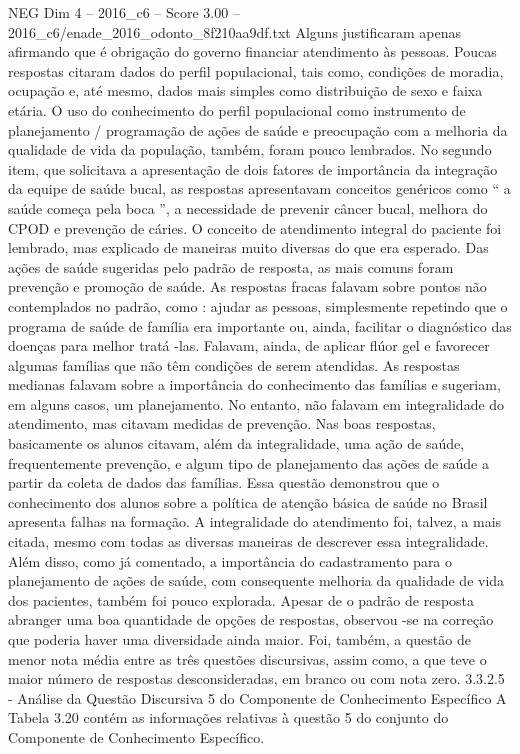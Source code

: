 \begin{textsample}{NEG Dim 4 – 2016\_c6 – Score 3.00 – 2016\_c6/enade\_2016\_odonto\_8f210aa9df.txt}
Alguns justificaram apenas afirmando que é obrigação do governo financiar atendimento às pessoas.
Poucas respostas citaram dados do perfil populacional, tais como, condições de moradia, ocupação e, até mesmo, dados mais simples como distribuição de sexo e faixa etária.
O uso do conhecimento do perfil populacional como instrumento de planejamento / programação de ações de saúde e preocupação com a melhoria da qualidade de vida da população, também, foram pouco lembrados.
No segundo item, que solicitava a apresentação de dois fatores de importância da integração da equipe de saúde bucal, as respostas apresentavam conceitos genéricos como “ a saúde começa pela boca ”, a necessidade de prevenir câncer bucal, melhora do CPOD e prevenção de cáries.
O conceito de atendimento integral do paciente foi lembrado, mas explicado de maneiras muito diversas do que era esperado.
Das ações de saúde sugeridas pelo padrão de resposta, as mais comuns foram prevenção e promoção de saúde.
As respostas fracas falavam sobre pontos não contemplados no padrão, como : ajudar as pessoas, simplesmente repetindo que o programa de saúde de família era importante ou, ainda, facilitar o diagnóstico das doenças para melhor tratá -las.
Falavam, ainda, de aplicar flúor gel e favorecer algumas famílias que não têm condições de serem atendidas.
As respostas medianas falavam sobre a importância do conhecimento das famílias e sugeriam, em alguns casos, um planejamento.
No entanto, não falavam em integralidade do atendimento, mas citavam medidas de prevenção.
Nas boas respostas, basicamente os alunos citavam, além da integralidade, uma ação de saúde, frequentemente prevenção, e algum tipo de planejamento das ações de saúde a partir da coleta de dados das famílias.
Essa questão demonstrou que o conhecimento dos alunos sobre a política de atenção básica de saúde no Brasil apresenta falhas na formação.
A integralidade do atendimento foi, talvez, a mais citada, mesmo com todas as diversas maneiras de descrever essa integralidade.
Além disso, como já comentado, a importância do cadastramento para o planejamento de ações de saúde, com consequente melhoria da qualidade de vida dos pacientes, também foi pouco explorada.
Apesar de o padrão de resposta abranger uma boa quantidade de opções de respostas, observou -se na correção que poderia haver uma diversidade ainda maior.
Foi, também, a questão de menor nota média entre as três questões discursivas, assim como, a que teve o maior número de respostas desconsideradas, em branco ou com nota zero. 3.3.2.5 - Análise da Questão Discursiva 5 do Componente de Conhecimento Específico A Tabela 3.20 contém as informações relativas à questão 5 do conjunto do Componente de Conhecimento Específico.

\end{textsample}
